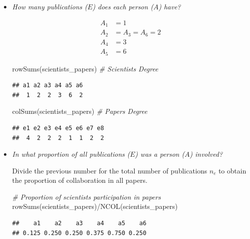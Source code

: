 \documentclass[
  notitlepage,
  onecolumn,
  openany]{book}
\newenvironment{Shaded}{\begin{snugshade}}{\end{snugshade}}
\newcommand{\CommentTok}[1]{\textcolor[rgb]{0.56,0.35,0.01}{\textit{#1}}}
\newcommand{\FunctionTok}[1]{\textcolor[rgb]{0.00,0.00,0.00}{#1}}
\newcommand{\NormalTok}[1]{#1}
\newcommand{\SpecialCharTok}[1]{\textcolor[rgb]{0.00,0.00,0.00}{#1}}
\begin{document}
\begin{itemize}
\item
  \emph{How many publications (\(E\)) does each person (\(A\)) have?}

  \[
    \begin{aligned}
    A_1 &= 1 \\
    A_2 &= A_3 = A_6 = 2 \\
    A_4 &= 3 \\
    A_5 &= 6
    \end{aligned}
    \]

\begin{Shaded}
\begin{Highlighting}[]
\FunctionTok{rowSums}\NormalTok{(scientists\_papers) }\CommentTok{\# Scientists Degree}
\end{Highlighting}
\end{Shaded}

\begin{verbatim}
## a1 a2 a3 a4 a5 a6 
##  1  2  2  3  6  2
\end{verbatim}

\begin{Shaded}
\begin{Highlighting}[]
\FunctionTok{colSums}\NormalTok{(scientists\_papers) }\CommentTok{\# Papers Degree}
\end{Highlighting}
\end{Shaded}

\begin{verbatim}
## e1 e2 e3 e4 e5 e6 e7 e8 
##  4  2  2  2  1  1  2  2
\end{verbatim}
\item
  \emph{In what proportion of all publications (\(E\)) was a person (\(A\)) involved?}

  Divide the previous number for the total number of publications \(n_e\) to obtain the proportion of collaboration in all papers.

\begin{Shaded}
\begin{Highlighting}[]
\CommentTok{\# Proportion of scientists participation in papers}
\FunctionTok{rowSums}\NormalTok{(scientists\_papers)}\SpecialCharTok{/}\FunctionTok{NCOL}\NormalTok{(scientists\_papers)}
\end{Highlighting}
\end{Shaded}

\begin{verbatim}
##    a1    a2    a3    a4    a5    a6 
## 0.125 0.250 0.250 0.375 0.750 0.250
\end{verbatim}


\end{itemize}
\end{document}
